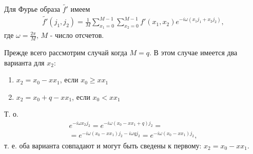 Для Фурье образа $\tilde{f'}$ имеем 
\begin{eqnarray}
\tilde{f'}\left(j_1, j_2\right) = 
\frac{1}{M}\sum_{x_1 = 0}^{M-1}\sum_{x_2 = 0}^{M-1} 
f'\left(x_1, x_2\right)e^{-i \omega\left(x_1 j_1 + x_2j_2\right)},
\label{eq:part4:quantcomp:discretlog:ftq16_pre}
\end{eqnarray}
где $\omega = \frac{2 \pi}{M}$, $M$ - число отсчетов. 

Прежде всего рассмотрим случай когда $M = q$. В этом случае имеется
два варианта для $x_2$:  
\begin{enumerate}
\item $x_2 = x_0 - x x_1$, если $x_0 \ge x x_1$
\item $x_2 = x_0 + q - x x_1$, если $x_0 < x x_1$
\end{enumerate}
Т. о.
\begin{eqnarray}
e^{-i \omega x_2j_2} = e^{-i \omega\left(x_0 - x x_1 + q\right) j_2} = 
\nonumber \\
= e^{-i \omega\left(x_0 - x x_1\right) j_2 - i \omega q j_2} = 
e^{-i \omega\left(x_0 - x x_1\right) j_2},
\nonumber
\end{eqnarray}
т. е. оба варианта совпадают и могут быть сведены к первому:
$x_2 = x_0 - x x_1$.

